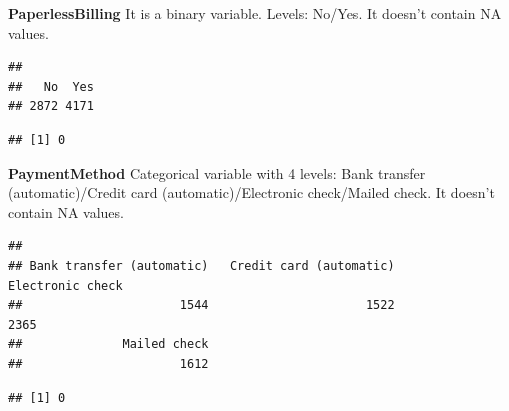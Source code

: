 \documentclass[
  twoside]{article}
\newenvironment{Shaded}{\begin{snugshade}}{\end{snugshade}}
\newcommand{\FunctionTok}[1]{\textcolor[rgb]{0.00,0.00,0.00}{#1}}
\newcommand{\NormalTok}[1]{#1}
\newcommand{\SpecialCharTok}[1]{\textcolor[rgb]{0.00,0.00,0.00}{#1}}
\begin{document}
\textbf{PaperlessBilling} It is a binary variable. Levels: No/Yes. It
doesn't contain NA values.

\begin{Shaded}
\end{Shaded}

\begin{verbatim}
## 
##   No  Yes 
## 2872 4171
\end{verbatim}

\begin{Shaded}
\end{Shaded}

\begin{verbatim}
## [1] 0
\end{verbatim}

\textbf{PaymentMethod} Categorical variable with 4 levels: Bank transfer
(automatic)/Credit card (automatic)/Electronic check/Mailed check. It
doesn't contain NA values.

\begin{Shaded}
\end{Shaded}

\begin{verbatim}
## 
## Bank transfer (automatic)   Credit card (automatic)          Electronic check 
##                      1544                      1522                      2365 
##              Mailed check 
##                      1612
\end{verbatim}

\begin{Shaded}
\end{Shaded}

\begin{verbatim}
## [1] 0
\end{verbatim}
\end{document}
